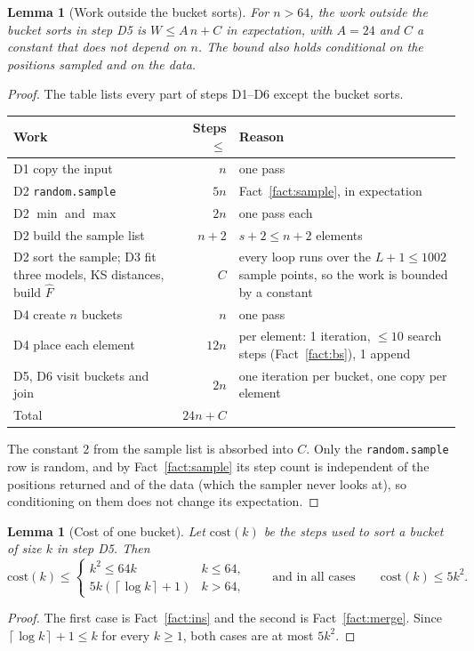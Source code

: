 \documentclass[11pt]{article}
\newtheorem{lemma}[theorem]{Lemma}
\theoremstyle{definition}
\theoremstyle{remark}
\newcommand{\Fh}{\widehat{F}}
\newcommand{\ceil}[1]{\left\lceil #1 \right\rceil}
\newcommand{\code}[1]{\texttt{#1}}
\begin{document}
\begin{lemma}[Work outside the bucket sorts]\label{lem:overhead}
For $n>64$, the work outside the bucket sorts in step D5 is $W\le A\,n+C$
in expectation, with $A=24$ and $C$ a constant that does not depend on
$n$. The bound also holds conditional on the positions sampled and on the
data.
\end{lemma}
\begin{proof}
The table lists every part of steps D1--D6 except the bucket sorts.
\begin{center}
\renewcommand{\arraystretch}{1.15}
\begin{tabular}{@{}>{\raggedright}p{}r>{\raggedright\arraybackslash}p{}@{}}
\toprule
Work & Steps $\le$ & Reason\\
\midrule
D1 copy the input & $n$ & one pass\\
D2 \code{random.sample} & $5n$ & Fact~\ref{fact:sample}, in expectation\\
D2 $\min$ and $\max$ & $2n$ & one pass each\\
D2 build the sample list & $n+2$ & $s+2\le n+2$ elements\\
D2 sort the sample; D3 fit three models, KS distances, build $\Fh$ & $C$ & every loop runs over the $L+1\le1002$ sample points, so the work is bounded by a constant\\
D4 create $n$ buckets & $n$ & one pass\\
D4 place each element & $12n$ & per element: 1 iteration, $\le10$ search steps (Fact~\ref{fact:bs}), 1 append\\
D5, D6 visit buckets and join & $2n$ & one iteration per bucket, one copy per element\\
\midrule
Total & $24n+C$ &\\
\bottomrule
\end{tabular}
\end{center}
The constant $2$ from the sample list is absorbed into $C$. Only the
\code{random.sample} row is random, and by Fact~\ref{fact:sample} its step
count is independent of the positions returned and of the data (which the
sampler never looks at), so conditioning on them does not change its
expectation.
\end{proof}

\begin{lemma}[Cost of one bucket]\label{lem:bucket}
Let $\mathrm{cost}(k)$ be the steps used to sort a bucket of size $k$ in
step D5. Then
\[
\mathrm{cost}(k)\le
\begin{cases}
k^2\le 64k & k\le 64,\\
5k(\ceil{\log k}+1) & k>64,
\end{cases}
\qquad\text{and in all cases}\qquad \mathrm{cost}(k)\le 5k^2 .
\]
\end{lemma}
\begin{proof}
The first case is Fact~\ref{fact:ins} and the second is
Fact~\ref{fact:merge}. Since $\ceil{\log k}+1\le k$ for every $k\ge1$,
both cases are at most $5k^2$.
\end{proof}
\end{document}
